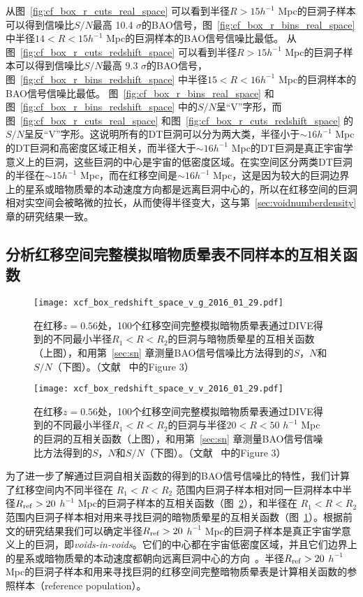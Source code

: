 {从图~\ref{fig:cf_box_r_cuts_real_space} 可以看到半径$R > 15 h^{-1}$ Mpc的巨洞子样本可以得到信噪比$S/N$最高 10.4 $\sigma$的BAO信号，图~\ref{fig:cf_box_r_bins_real_space} 中半径$14 < R < 15 h^{-1}$ Mpc的巨洞样本的BAO信号信噪比最低。
从图~\ref{fig:cf_box_r_cuts_redshift_space} 可以看到半径$R > 15 h^{-1}$ Mpc的巨洞子样本可以得到信噪比$S/N$最高 9.3 $\sigma$的BAO信号，图~\ref{fig:cf_box_r_bins_redshift_space} 中半径$15 < R < 16 h^{-1}$ Mpc的巨洞样本的BAO信号信噪比最低。
图~\ref{fig:cf_box_r_bins_real_space} 和图~\ref{fig:cf_box_r_bins_redshift_space} 中的$S/N$呈“V”字形，而图~\ref{fig:cf_box_r_cuts_real_space} 和图~\ref{fig:cf_box_r_cuts_redshift_space} 的$S/N$呈反“V”字形。这说明所有的DT巨洞可以分为两大类，半径小于$\sim 16 h^{-1}$ Mpc的DT巨洞和高密度区域正相关，而半径大于$\sim 16 h^{-1}$ Mpc的DT巨洞是真正宇宙学意义上的巨洞，这些巨洞的中心是宇宙的低密度区域。在实空间区分两类DT巨洞的半径在$\sim 15 h^{-1}$ Mpc，而在红移空间是$\sim 16 h^{-1}$ Mpc，这是因为较大的巨洞边界上的星系或暗物质晕的本动速度方向都是远离巨洞中心的，所以在红移空间的巨洞相对实空间会被略微的拉长，从而使得半径变大，这与第~\ref{sec:voidnumberdensity} 章的研究结果一致。

\subsection{分析红移空间完整模拟暗物质晕表不同样本的互相关函数}
\label{sec:cross}

\begin{figure}
\centering
\texttt{[image: xcf\_box\_redshift\_space\_v\_g\_2016\_01\_29.pdf]}
\caption{在红移$z = 0.56$处，100个红移空间完整模拟暗物质晕表通过DIVE得到的不同最小半径$R_1 < R < R_2$的巨洞与暗物质晕星的互相关函数（上图），和用第~\ref{sec:sn} 章测量BAO信号信噪比方法得到的$S$，$N$和$S/N$（下图）。（文献 ~中的Figure 3）}
\label{fig:xcf_box_redshift_space_v_g}
\end{figure}

\begin{figure}
\centering
\texttt{[image: xcf\_box\_redshift\_space\_v\_v\_2016\_01\_29.pdf]}
\caption{在红移$z = 0.56$处，100个红移空间完整模拟暗物质晕表通过DIVE得到的不同最小半径$R_1 < R < R_2$的巨洞与半径$20 < R < 50$ $h^{-1}$ Mpc的巨洞的互相关函数（上图），和用第~\ref{sec:sn} 章测量BAO信号信噪比方法得到的$S$，$N$和$S/N$（下图）。（文献 ~中的Figure 3）}
\label{fig:xcf_box_redshift_space_v_v}
\end{figure}

为了进一步了解通过巨洞自相关函数的得到的BAO信号信噪比的特性，我们计算了红移空间内不同半径在 $R_1 < R < R_2$ 范围内巨洞子样本相对同一巨洞样本中半径$R_{\rm ref}>20$ $h^{-1}$ Mpc的巨洞子样本的互相关函数（图~\ref{fig:xcf_box_redshift_space_v_v}），和半径在 $R_1 < R < R_2$ 范围内巨洞子样本相对用来寻找巨洞的暗物质晕星的互相关函数（图~\ref{fig:xcf_box_redshift_space_v_g}）。根据前文的研究结果我们可以确定半径$R_{\rm ref}>20$ $h^{-1}$ Mpc的巨洞子样本是真正宇宙学意义上的巨洞，即\textit{voids-in-voids}。它们的中心都在宇宙低密度区域，并且它们边界上的星系或暗物质晕的本动速度都朝向远离巨洞中心的方向~\cite{Zhao2016DIVE}。半径$R_{\rm ref}>20$ $h^{-1}$ Mpc的巨洞子样本和用来寻找巨洞的红移空间完整暗物质晕表是计算相关函数的参照样本（reference population）。

}
